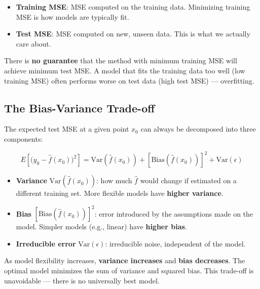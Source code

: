 \documentclass[11pt,a4paper]{article}
\theoremstyle{definition}
\theoremstyle{plain}
\theoremstyle{remark}
\begin{document}
\begin{itemize}
    \item \textbf{Training MSE}: MSE computed on the training data. Minimizing training MSE is how models are typically fit.
    \item \textbf{Test MSE}: MSE computed on new, unseen data. This is what we actually care about.
\end{itemize}

\begin{tcolorbox}[colback=orange!5!white,colframe=orange!75!black]
There is \textbf{no guarantee} that the method with minimum training MSE will achieve minimum test MSE. A model that fits the training data too well (low training MSE) often performs worse on test data (high test MSE) — overfitting.
\end{tcolorbox}

\subsection{The Bias-Variance Trade-off}

The expected test MSE at a given point $x_0$ can always be decomposed into three components:

\[
    E\!\left[\bigl(y_0 - \hat{f}(x_0)\bigr)^2\right]
    = \mathrm{Var}\!\left(\hat{f}(x_0)\right) + \left[\mathrm{Bias}\!\left(\hat{f}(x_0)\right)\right]^2 + \mathrm{Var}(\epsilon)
\]

\begin{itemize}
    \item \textbf{Variance} $\mathrm{Var}(\hat{f}(x_0))$: how much $\hat{f}$ would change if estimated on a different training set. More flexible models have \textbf{higher variance}.
    \item \textbf{Bias} $[\mathrm{Bias}(\hat{f}(x_0))]^2$: error introduced by the assumptions made on the model. Simpler models (e.g., linear) have \textbf{higher bias}.
    \item \textbf{Irreducible error} $\mathrm{Var}(\epsilon)$: irreducible noise, independent of the model.
\end{itemize}

\begin{tcolorbox}[colback=blue!5!white,colframe=blue!75!black,title=\textbf{Bias-Variance Trade-off}]
As model flexibility increases, \textbf{variance increases} and \textbf{bias decreases}. The optimal model minimizes the sum of variance and squared bias. This trade-off is unavoidable — there is no universally best model.
\end{tcolorbox}
\end{document}
